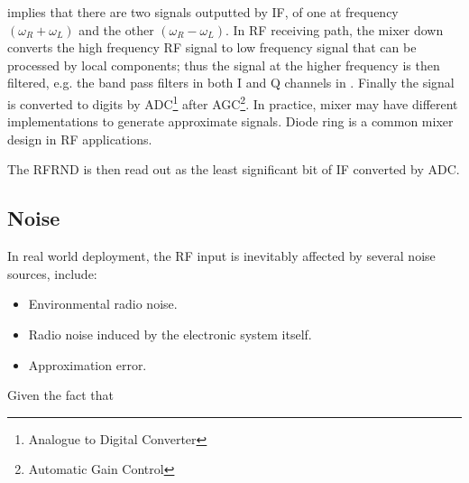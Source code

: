  implies that there are two signals outputted by IF, of one at frequency $(\omega_{R} + \omega_{L})$ and the other $(\omega_{R} - \omega_{L})$. In RF receiving path,  the mixer down converts the high frequency RF signal to low frequency signal that can be processed by local components; thus the signal at the higher frequency is then filtered, e.g. the band pass filters in both I and Q channels in . Finally the signal is converted to digits by ADC\footnote{Analogue to Digital Converter} after AGC\footnote{Automatic Gain Control}. In practice, mixer may have different implementations to generate approximate signals. Diode ring is a common mixer design in RF applications. 

The RFRND is then read out as the least significant bit of IF converted by ADC.

\subsection{Noise}

In real world deployment, the RF input is inevitably affected by several noise sources, include:

\begin{itemize}
\item Environmental radio noise.
\item Radio noise induced by the electronic system itself.
\item Approximation error.
\end{itemize}

Given the fact that 
